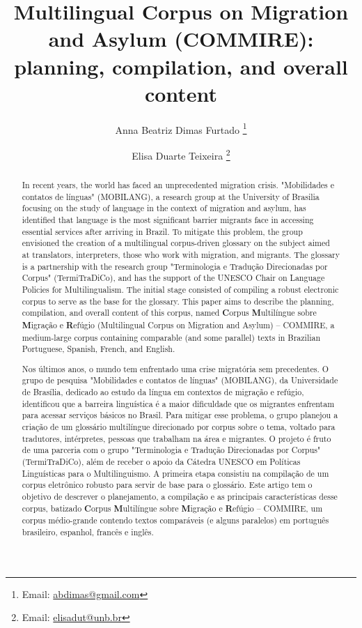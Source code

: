 \documentclass[english]{textolivre}
\title{Multilingual Corpus on Migration and Asylum (COMMIRE): planning, compilation, and overall content}
\author[1]{Anna Beatriz Dimas Furtado \orcid{0000-0002-2801-5146} \thanks{Email: \url{abdimas@gmail.com}}}
\author[2]{Elisa Duarte Teixeira \orcid{0000-0003-3472-3605} \thanks{Email: \url{elisadut@unb.br}}}
\affil[1]{University of Wolverhampton, Faculty of Science and Engineering, School of Mathematics and Computer Science, Wolverhampton, West Midlands, United Kingdom.}
\affil[2]{Universidade de Brasília, Instituto de Letras, Departamento de Línguas Estrangeiras e Tradução, DF, Brasil.}
\begin{document}
\maketitle

\begin{polyabstract}
\begin{abstract}
In recent years, the world has faced an unprecedented migration crisis. "Mobilidades e contatos de línguas" (MOBILANG), a research group at the University of Brasilia focusing on the study of language in the context of migration and asylum, has identified that language is the most significant barrier migrants face in accessing essential services after arriving in Brazil. To mitigate this problem, the group envisioned the creation of a multilingual corpus-driven glossary on the subject aimed at translators, interpreters, those who work with migration, and migrants. The glossary is a partnership with the research group "Terminologia e Tradução Direcionadas por Corpus" (TermiTraDiCo), and has the support of the UNESCO Chair on Language Policies for Multilingualism. The initial stage consisted of compiling a robust electronic corpus to serve as the base for the glossary. This paper aims to describe the planning, compilation, and overall content of this corpus, named \textbf{C}orpus \textbf{M}ultilíngue sobre \textbf{M}igração e \textbf{R}efúgio (Multilingual Corpus on Migration and Asylum) -- COMMIRE, a medium-large corpus containing comparable (and some parallel) texts in Brazilian Portuguese, Spanish, French, and English.

\end{abstract}

\begin{portuguese}
\begin{abstract}
Nos últimos anos, o mundo tem enfrentado uma crise migratória sem precedentes. O grupo de pesquisa "Mobilidades e contatos de línguas" (MOBILANG), da Universidade de Brasília, dedicado ao estudo da língua em contextos de migração e refúgio, identificou que a barreira linguística é a maior dificuldade que os migrantes enfrentam para acessar serviços básicos no Brasil. Para mitigar esse problema, o grupo planejou a criação de um glossário multilíngue direcionado por corpus sobre o tema, voltado para tradutores, intérpretes, pessoas que trabalham na área e migrantes. O projeto é fruto de uma parceria com o grupo "Terminologia e Tradução Direcionadas por Corpus" (TermiTraDiCo), além de receber o apoio da Cátedra UNESCO em Políticas Linguísticas para o Multilinguismo. A primeira etapa consistiu na compilação de um corpus eletrônico robusto para servir de base para o glossário. Este artigo tem o objetivo de descrever o planejamento, a compilação e as principais características desse corpus, batizado \textbf{C}orpus \textbf{M}ultilíngue sobre \textbf{M}igração e \textbf{R}efúgio -- COMMIRE, um corpus médio-grande contendo textos comparáveis (e alguns paralelos) em português brasileiro, espanhol, francês e inglês.


\end{abstract}
\end{portuguese}
\end{polyabstract}
\end{document}
